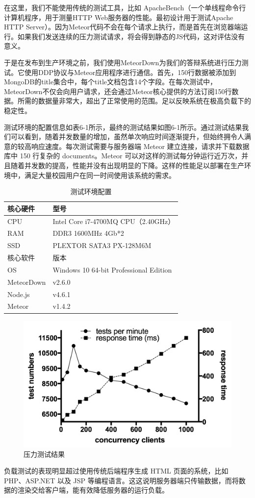 在这里，我们不能使用传统的测试工具，比如 ApacheBench（一个单线程命令行计算机程序，用于测量HTTP Web服务器的性能。最初设计用于测试Apache HTTP Server）。因为Meteor代码不会在每个请求上执行，而是首先在浏览器端运行。如果我们发送连续的压力测试请求，将会得到静态的JS代码，这对评估没有意义。

于是在发布到生产环境之前，我们使用MeteorDown为我们的答辩系统进行压力测试。它使用DDP协议与Meteor应用程序进行通信。首先，150行数据被添加到MongoDB的title集合中，每个title文档包含14个字段。在每次测试中，MeteorDown不仅会向用户请求，还会通过Meteor核心提供的方法订阅150行数据。所需的数据量非常大，超出了正常使用的范围。足以反映系统在极高负载下的稳定性。

测试环境的配置信息如表6-1所示，最终的测试结果如图6-1所示。通过测试结果我们可以看到，随着并发数量的增加，虽然单次响应时间逐渐提升，但始终拥令人满意的较高响应速度。每次测试需要与服务器端  Meteor 建立连接，请求并下载数据库中 150 行复杂的 documents。Meteor 可以对这样的测试每分钟运行近万次，并且随着并发数的提高，性能并没有出现明显的下降。这样的性能足以部署在生产环境中，满足大量校园用户在同一时间使用该系统的需求。

\begin{table}
	\centering
	\caption{测试环境配置}  %
	\begin{tabular}{ll} 
		\hline
		\hline
		核心硬件 & 型号 \\ 
		\hline
		CPU	& Intel Core i7-4700MQ CPU（2.40GHz）\\
		RAM	& DDR3 1600MHz 4Gb*2 \\
		SSD	& PLEXTOR SATA3 PX-128M6M \\
		\hline
		\hline
		核心软件 & 版本 \\ 
		\hline
		OS	& Windows 10 64-bit Professional Edition \\
		MeteorDown & v2.6.0 \\
		Node.js & v4.6.1 \\
		Meteor & v1.4.2 \\
		\hline
	\end{tabular}
\end{table}

\begin{figure}
	\centering
	\includegraphics[width=0.7\linewidth]{figure/test_result}
	\caption{压力测试结果}
\end{figure}

负载测试的表现明显超过使用传统后端程序生成 HTML 页面的系统，比如 PHP、ASP.NET 以及 JSP 等编程语言。这这说明服务器端只传输数据，而将数据的渲染交给客户端，能有效降低服务器的运行负载。

